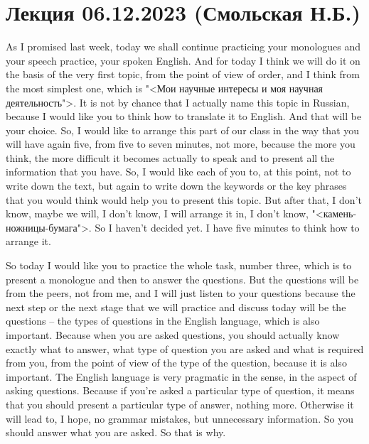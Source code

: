 \documentclass[main.tex]{subfiles}
\begin{document}
\section{Лекция 06.12.2023 (Смольская Н.Б.)}

As I promised last week, today we shall continue practicing your monologues and your speech practice, your spoken English.
And for today I think we will do it on the basis of the very first topic, from the point of view of order, and I think from the most simplest one, which is "<Мои научные интересы и моя научная деятельность">.
It is not by chance that I actually name this topic in Russian, because I would like you to think how to translate it to English.
And that will be your choice.
So, I would like to arrange this part of our class in the way that you will have again five, from five to seven minutes, not more, because the more you think, the more difficult it becomes actually to speak and to present all the information that you have.
So, I would like each of you to, at this point, not to write down the text, but again to write down the keywords or the key phrases that you would think would help you to present this topic.
But after that, I don't know, maybe we will, I don't know, I will arrange it in, I don't know, "<камень-ножницы-бумага">.
So I haven't decided yet.
I have five minutes to think how to arrange it.

So today I would like you to practice the whole task, number three, which is to present a monologue and then to answer the questions.
But the questions will be from the peers, not from me, and I will just listen to your questions because the next step or the next stage that we will practice and discuss today will be the questions -- the types of questions in the English language, which is also important.
Because when you are asked questions, you should actually know exactly what to answer, what type of question you are asked and what is required from you, from the point of view of the type of the question, because it is also important.
The English language is very pragmatic in the sense, in the aspect of asking questions.
Because if you're asked a particular type of question, it means that you should present a particular type of answer, nothing more.
Otherwise it will lead to, I hope, no grammar mistakes, but unnecessary information.
So you should answer what you are asked.
So that is why.
\end{document}
